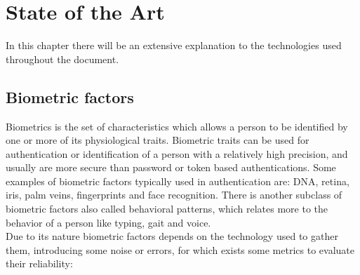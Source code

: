 \chapter{State of the Art}

In this chapter there will be an extensive explanation to the technologies used
throughout the document.



\section{Biometric factors}
Biometrics is the set of characteristics which allows a person to be identified
by one or more of its physiological traits. Biometric traits can be used for
authentication or identification of a person with a relatively high precision, and
usually are more secure than password or token based authentications. Some examples
of biometric factors typically used in authentication are: DNA, retina, iris, palm
veins, fingerprints and face recognition. There is another subclass of biometric
factors also called behavioral patterns, which relates more to the behavior of a person
like typing, gait and voice.\\
Due to its nature biometric factors depends on the technology used to gather them,
introducing some noise or errors, for which exists some metrics to evaluate their
reliability:

